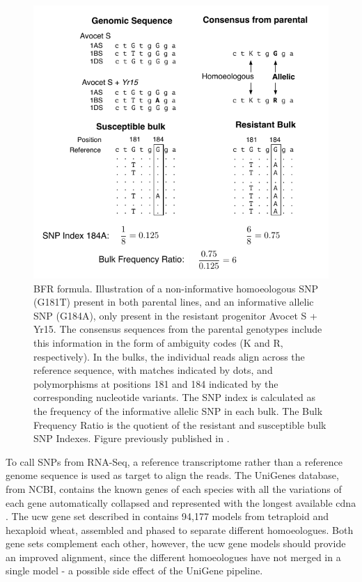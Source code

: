 \begin{figure}
\includegraphics[width=1\textwidth]{Yr15/Figures/bfr.pdf}
\caption[BFR formula]{BFR formula. Illustration of a non-informative homoeologous SNP (G181T) present in both parental lines, and an informative allelic SNP (G184A), only present in the resistant progenitor Avocet S + Yr15. The consensus sequences from the parental genotypes include this information in the form of ambiguity codes (K and R, respectively). In the bulks, the individual reads align across the reference sequence, with matches indicated by dots, and polymorphisms at positions 181 and 184 indicated by the corresponding nucleotide variants. The SNP index is calculated as the frequency of the informative allelic SNP in each bulk. The Bulk Frequency Ratio is the quotient of the resistant and susceptible bulk SNP Indexes. Figure previously published in \citet{Ramirez-Gonzalez2015c}. }
\label{fig:yr15:bfr}
\end{figure}

To call SNPs from RNA-Seq, a reference transcriptome rather than a reference genome sequence is used as target to align the reads. 
The UniGenes database, from NCBI, contains the known genes of each species with all the variations of each gene automatically collapsed and represented with the longest available \acrshort{cdna} \citep{PontiusJUWagnerL2002}. 
The \acrshort{ucw}  gene set described in \citet{Krasileva2013} contains 94,177 models from tetraploid and hexaploid wheat, assembled and phased to separate different homoeologues. 
Both gene sets complement each other, however, the \acrshort{ucw} gene models should provide an improved alignment, since the different homoeologues have not merged in a single model - a possible side effect of the UniGene pipeline. 

